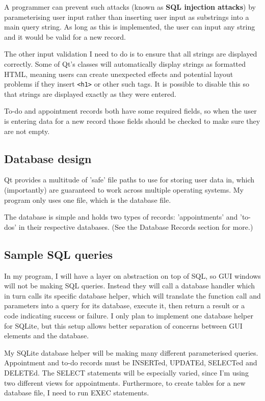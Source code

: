 A programmer can prevent such attacks (known as \textbf{SQL injection
attacks}) by parameterising user input rather than inserting user input as
substrings into a main query string. As long as this is implemented, the user
can input any string and it would be valid for a new record.

The other input validation I need to do is to ensure that all strings are
displayed correctly. Some of Qt's classes will automatically display strings as
formatted HTML, meaning users can create unexpected effects and potential layout
problems if they insert \texttt{<h1>} or other such tags. It is possible to
disable this so that strings are displayed exactly as they were entered.

To-do and appointment records both have some required fields, so when the user
is entering data for a new record those fields should be checked to make sure
they are not empty.


\subsection{Database design}

Qt provides a multitude of 'safe' file paths to use for storing user data in,
which (importantly) are guaranteed to work across multiple operating systems. My
program only uses one file, which is the database file.

The database is simple and holds two types of records: 'appointments' and
'to-dos' in their respective databases. (See the Database Records section for
more.)


\subsection{Sample SQL queries}

In my program, I will have a layer on abstraction on top of SQL, so GUI windows
will not be making SQL queries. Instead they will call a database handler which
in turn calls its specific database helper, which will translate the function
call and parameters into a query for its database, execute it, then return a
result or a code indicating success or failure. I only plan to implement one
database helper for SQLite, but this setup allows better separation of concerns
between GUI elements and the database.

My SQLite database helper will be making many different parameterised queries.
Appointment and to-do records must be INSERTed, UPDATEd, SELECTed and DELETEd.
The SELECT statements will be especially varied, since I'm using two different
views for appointments. Furthermore, to create tables for a new database file, I
need to run EXEC statements.

